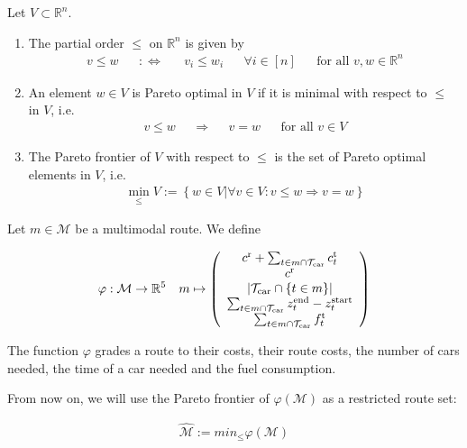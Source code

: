 \begin{definition}

Let $V\subset\mathbb{R}^n$.

\begin{enumerate}
	\item{The partial order $\leq$ on $\mathbb{R}^n$ is given by
		\begin{align*}
			v\leq w && :\Leftrightarrow && v_i\leq w_i && \forall i\in[n] && \text{for all }v,w\in\mathbb{R}^n
		\end{align*}}
	\item{An element $w\in V$ is Pareto optimal in $V$ if it is minimal with respect to $\leq$ in $V$, i.e.
		\begin{align*}
			v\leq w && \Rightarrow && v=w && \text{for all } v\in V
		\end{align*}}
	\item{The Pareto frontier of $V$ with respect to $\leq$ is the set of Pareto optimal elements in $V$, i.e.
		\begin{align*}
			\operatorname{min}_{\leq} V := \left\{w\in V|\forall v\in V: v\leq w \Rightarrow v=w\right\}
		\end{align*}}
\end{enumerate}

\end{definition}

Let $m\in\mathcal{M}$ be a multimodal route. We define

\begin{align*}
	\varphi:\mathcal{M}\to\mathbb{R}^5 && m\mapsto\left(
	\begin{array}{c}
		c^{\operatorname{r}} + \sum_{t\in m\cap\mathcal{T}_{\operatorname{car}}}c^{\operatorname{t}}_t \\
		c^{\operatorname{r}} \\
		|\mathcal{T}_{\operatorname{car}}\cap\{t\in m\}|\\
		\sum_{t\in m\cap\mathcal{T}_{\operatorname{car}}} z^{\operatorname{end}}_t - z^{\operatorname{start}}_t \\
		\sum_{t\in m\cap\mathcal{T}_{\operatorname{car}}} f^{\operatorname{t}}_t
	\end{array} \right)
\end{align*}

The function $\varphi$ grades a route to their costs, their route costs, the number of cars needed, the time of a car needed and the fuel consumption.

From now on, we will use the Pareto frontier of $\varphi\left(\mathcal{M}\right)$ as a restricted route set:

\begin{align}
	\hat{\mathcal{M}} := min_{\leq} \varphi\left(\mathcal{M}\right)
\end{align}